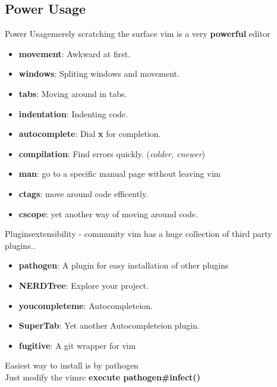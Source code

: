 \documentclass{beamer}
\begin{document}
\subsection{Power Usage}
\begin{frame}{Power Usage}{merely scratching the surface}
	vim is a very \textbf{powerful} editor \\
	\pause
	\begin{itemize}
			\item {
					\textbf{movement}: Awkward at first.
					\pause
					}
			\item {
					\textbf{windows}: Spliting windows and movement.
					\pause
					}
			\item {
					\textbf{tabs}: Moving around in tabs.
					\pause
					}
			\item {
					\textbf{indentation}: Indenting code.
					\pause
					}
			\item {
					\textbf{autocomplete}: Dial \textbf{x} for completion.
					\pause
					}
			\item {
					\textbf{compilation}: Find errors quickly. (\textit{colder, cnewer})
					\pause
					}
			\item {
					\textbf{man}: go to a specific manual page without leaving vim
					\pause
					}
			\item {
					\textbf{ctags}: move around code efficently.
					\pause
					}
			\item {
					\textbf{cscope}: yet another way of moving around code.
					}

	\end{itemize}
\end{frame}
\begin{frame}{Plugins}{extensibility - community}
	vim has a huge collection of third party plugins.. 
	\pause
	\begin{itemize}
		\item {
				\textbf{pathogen}: A plugin for easy installation of other plugins
				\pause
				}
		\item {
				\textbf{NERDTree}: Explore your project.
				\pause
				}
		\item {
				\textbf{youcompleteme}: Autocompleteion.
				\pause
				}
		\item {
				\textbf{SuperTab}: Yet another Autocompleteion plugin.
				\pause
				}
		\item {
				\textbf{fugitive}: A git wrapper for vim
				\pause
				}
	\end{itemize}
	Easiest way to install is by \alert{pathogen}\\
	Just modify the vimrc \textbf{execute pathogen\#infect()}
\end{frame}
\end{document}
